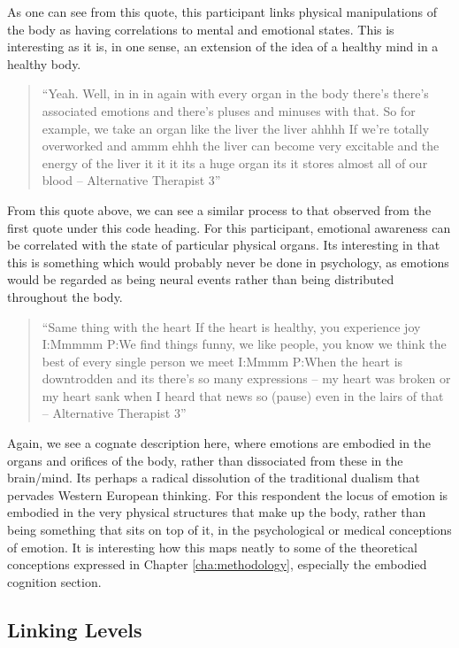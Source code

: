 As one can see from this quote, this participant links physical manipulations of the body as having correlations to mental and emotional states. This is interesting as it is, in one sense, an extension of the idea of a healthy mind in a healthy body. 


\begin{quotation}
``Yeah. Well, in in in again with every organ in the body there's there's associated emotions and there's pluses and minuses with that. So for example, we take an organ like the liver the liver ahhhh If we're totally overworked and ammm ehhh the liver can become very excitable and the energy of the liver it it it its a huge organ its it stores almost all of our blood – Alternative Therapist 3''  
\end{quotation}


From this quote above, we can see a similar process to that observed from the first quote under this code heading. For this participant, emotional awareness can be correlated with the state of particular physical organs. Its interesting in that this is something which would probably never be done in psychology, as emotions would be regarded as being neural events rather than being distributed throughout the body. 

\begin{quotation}
``Same thing with the heart If the heart is healthy, you experience joy 
I:Mmmmm
P:We find things funny, we like people, you know we think the best of every single person we meet 
I:Mmmm
P:When the heart is downtrodden and its there's so many expressions – my heart was broken or my heart sank when I heard that news so (pause) even in the lairs of that – Alternative Therapist 3''  
\end{quotation}


Again, we see a cognate description here, where emotions are embodied in the organs and orifices of the body, rather than dissociated from these in the brain/mind. Its perhaps a radical dissolution of the traditional dualism that pervades Western European thinking. For this respondent the locus of emotion is embodied in the very physical structures that make up the body, rather than being something that sits on top of it, in the psychological or medical conceptions of emotion. It is interesting how this maps neatly to some of the theoretical conceptions expressed in Chapter \ref{cha:methodology}, especially the embodied cognition section. 

\subsection{Linking Levels}

